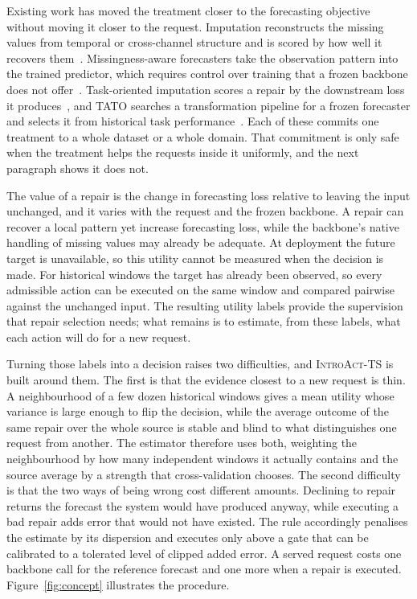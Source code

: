 \documentclass{article}
\newcommand{\introact}{\textsc{IntroAct-TS}}
\begin{document}
Existing work has moved the treatment closer to the forecasting objective without moving it
closer to the request. Imputation reconstructs the missing values from temporal or
cross-channel structure and is scored by how well it recovers
them~\citep{cao2018brits,tashiro2021csdi,du2023saits}. Missingness-aware forecasters take the
observation pattern into the trained predictor, which requires control over training that a
frozen backbone does not offer~\citep{chen2024bitgraph,peng2025s4m}. Task-oriented imputation
scores a repair by the downstream loss it
produces~\citep{wang2024taskoriented,hao2025toivsf,xu2026srdi}, and TATO searches a
transformation pipeline for a frozen forecaster and selects it from historical task
performance~\citep{qiu2026tato}. Each of these commits one treatment to a whole dataset or a
whole domain. That commitment is only safe when the treatment helps the requests inside it
uniformly, and the next paragraph shows it does not.

The value of a repair is the change in forecasting loss relative to leaving the input
unchanged, and it varies with the request and the frozen backbone. A repair can recover a
local pattern yet increase forecasting loss, while the backbone's native handling of missing
values may already be adequate. At deployment the future target is unavailable, so this
utility cannot be measured when the decision is made. For historical windows the target has
already been observed, so every admissible action can be executed on the same window and
compared pairwise against the unchanged input. The resulting utility labels provide the
supervision that repair selection needs; what remains is to estimate, from these labels, what
each action will do for a new request.

Turning those labels into a decision raises two difficulties, and \introact{} is built around
them. The first is that the evidence closest to a new request is thin. A neighbourhood of a
few dozen historical windows gives a mean utility whose variance is large enough to flip the
decision, while the average outcome of the same repair over the whole source is stable and
blind to what distinguishes one request from another. The estimator therefore uses both,
weighting the neighbourhood by how many independent windows it actually contains and the
source average by a strength that cross-validation chooses. The second difficulty is that the
two ways of being wrong cost different amounts. Declining to repair returns the forecast the
system would have produced anyway, while executing a bad repair adds error that would not have
existed. The rule accordingly penalises the estimate by its dispersion and executes only above
a gate that can be calibrated to a tolerated level of clipped added error. A
served request costs one backbone call for the reference forecast and one more when a repair
is executed. Figure~\ref{fig:concept} illustrates the procedure.
\end{document}
